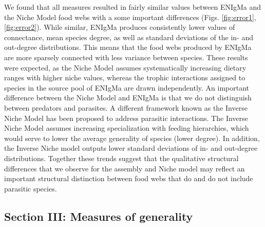 \documentclass[twocolumn,preprintnumbers,amsmath,amssymb,superscriptaddress]{revtex4}
\begin{document}
We found that all measures resulted in fairly similar values between ENIgMa and the Niche Model food webs with a some important differences (Figs. \ref{fig:error1},\ref{fig:error2}).
While similar, ENIgMa produces consistently lower values of connectance, mean species degree, as well as standard deviations of the in- and out-degree distributions.
This means that the food webs produced by ENIgMa are more sparsely connected with less variance between species.
These results were expected, as the Niche Model assumes systematically increasing dietary ranges with higher niche values, whereas the trophic interactions assigned to species in the source pool of ENIgMa are drawn independently.
An important difference between the Niche Model and ENIgMa is that we do not distinguish between predators and parasites.
A different framework known as the Inverse Niche Model \cite{Warren2010} has been proposed to address parasitic interactions.
The Inverse Niche Model assumes increasing specialization with feeding hierarchies, which would serve to lower the average generality of species (lower degree).
In addition, the Inverse Niche model outputs lower standard deviations of in- and out-degree distributions.
Together these trends suggest that the qualitative structural differences that we observe for the assembly and Niche model may reflect an important structural distinction between food webs that do and do not include parasitic species.




\subsection*{Section III: Measures of generality}
\end{document}
